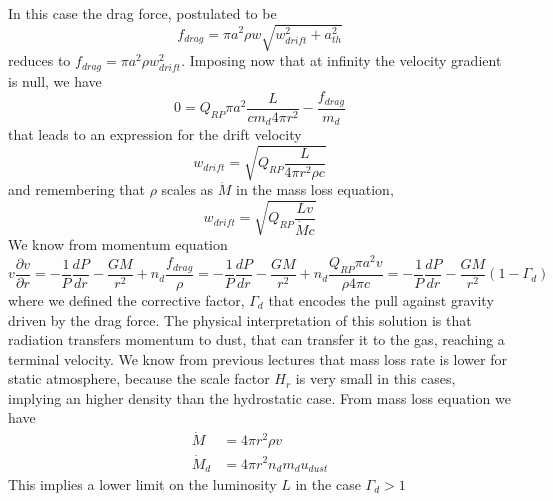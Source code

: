 \documentclass[main.tex]{subfiles}
\begin{document}
In this case the drag force, postulated to be
\begin{equation}
    f_{drag}=\pi a^2\rho w \sqrt{w_{drift}^2+a_{th}^2}
\end{equation}
reduces to $f_{drag}=\pi a^2\rho w_{drift}^2$.
Imposing now that at infinity the velocity gradient is null, we have
\begin{equation}
    0=Q_{RP}\pi a^2 \frac{L}{c m_d 4\pi r^2}-\frac{f_{drag}}{m_d}
\end{equation}
that leads to an expression for the drift velocity
\begin{equation}
    w_{drift}=\sqrt{Q_{RP}\frac{L}{4\pi r^2\rho c}}
\end{equation}
and remembering that $\rho$ scales as $\dot M$ in the mass loss equation,
\begin{equation}
    w_{drift}=\sqrt{Q_{RP}\frac{L v}{\dot M c}}
\end{equation}
We know from momentum equation
\begin{equation}
    v \frac{\partial v}{\partial r}=-\frac{1}{P}\frac{d P}{d r}-\frac{GM}{r^2}+n_d\frac{f_{drag}}{\rho}= -\frac{1}{P}\frac{d P}{d r}-\frac{GM}{r^2}+n_d\frac{Q_{RP}\pi a^2 v}{\rho 4\pi c}=-\frac{1}{P}\frac{d P}{d r}-\frac{GM}{r^2}(1-\Gamma_d)
\end{equation}
where we defined the corrective factor, $\Gamma_d$ that encodes the pull against gravity driven by the drag force. The physical interpretation of this solution is that radiation transfers momentum to dust, that can transfer it to the gas, reaching a terminal velocity.
We know from previous lectures that mass loss rate is lower for static atmosphere, because the scale factor $H_r$ is very small in this cases, implying an higher density than the hydrostatic case.
From mass loss equation we have
\begin{subequations}
\begin{align}
    \dot M&= 4\pi r^2 \rho v\\
    \dot M_d&=4\pi r^2 n_d m_d u_{dust}
\end{align}
\end{subequations}
This implies a lower limit on the luminosity $L$ in the case $\Gamma_d>1$
\end{document}
